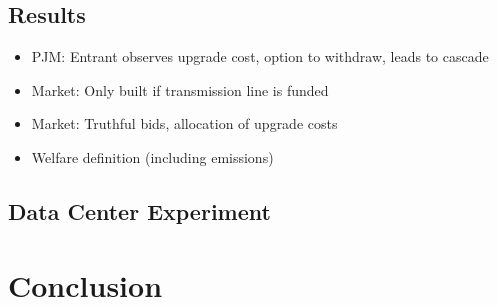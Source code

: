 \documentclass[12pt]{article}
\begin{document}
\subsection{Results}

\begin{itemize}
    \item PJM: Entrant observes upgrade cost, option to withdraw, leads to cascade
    \item Market: Only built if transmission line is funded 
    \item Market: Truthful bids, allocation of upgrade costs
    \item Welfare definition (including emissions)
\end{itemize}

\subsection{Data Center Experiment}

\section{Conclusion}
\label{sec:conclusion}

\clearpage

%

\end{document}
